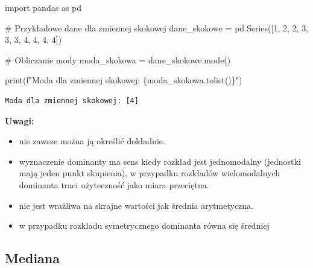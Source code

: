 \documentclass[
  polish,
  letterpaper,
  DIV=11,
  numbers=noendperiod]{scrreprt}
\newenvironment{Shaded}{\begin{snugshade}}{\end{snugshade}}
\newcommand{\BuiltInTok}[1]{\textcolor[rgb]{0.00,0.23,0.31}{#1}}
\newcommand{\CommentTok}[1]{\textcolor[rgb]{0.37,0.37,0.37}{#1}}
\newcommand{\DecValTok}[1]{\textcolor[rgb]{0.68,0.00,0.00}{#1}}
\newcommand{\ImportTok}[1]{\textcolor[rgb]{0.00,0.46,0.62}{#1}}
\newcommand{\NormalTok}[1]{\textcolor[rgb]{0.00,0.23,0.31}{#1}}
\newcommand{\OperatorTok}[1]{\textcolor[rgb]{0.37,0.37,0.37}{#1}}
\newcommand{\SpecialCharTok}[1]{\textcolor[rgb]{0.37,0.37,0.37}{#1}}
\newcommand{\SpecialStringTok}[1]{\textcolor[rgb]{0.13,0.47,0.30}{#1}}
\providecommand{\tightlist}{%
  \setlength{\itemsep}{0pt}\setlength{\parskip}{0pt}}
\begin{document}
\begin{Shaded}
\begin{Highlighting}[]
\ImportTok{import}\NormalTok{ pandas }\ImportTok{as}\NormalTok{ pd}

\CommentTok{\# Przykładowe dane dla zmiennej skokowej}
\NormalTok{dane\_skokowe }\OperatorTok{=}\NormalTok{ pd.Series([}\DecValTok{1}\NormalTok{, }\DecValTok{2}\NormalTok{, }\DecValTok{2}\NormalTok{, }\DecValTok{3}\NormalTok{, }\DecValTok{3}\NormalTok{, }\DecValTok{3}\NormalTok{, }\DecValTok{4}\NormalTok{, }\DecValTok{4}\NormalTok{, }\DecValTok{4}\NormalTok{, }\DecValTok{4}\NormalTok{])}

\CommentTok{\# Obliczanie mody}
\NormalTok{moda\_skokowa }\OperatorTok{=}\NormalTok{ dane\_skokowe.mode()}

\BuiltInTok{print}\NormalTok{(}\SpecialStringTok{f"Moda dla zmiennej skokowej: }\SpecialCharTok{\{}\NormalTok{moda\_skokowa}\SpecialCharTok{.}\NormalTok{tolist()}\SpecialCharTok{\}}\SpecialStringTok{"}\NormalTok{)}
\end{Highlighting}
\end{Shaded}

\begin{verbatim}
Moda dla zmiennej skokowej: [4]
\end{verbatim}

\textbf{Uwagi:}

\begin{itemize}
\tightlist
\item
  nie zawsze można ją określić dokładnie.
\item
  wyznaczenie dominanty ma sens kiedy rozkład jest jednomodalny
  (jednostki mają jeden punkt skupienia), w przypadku rozkładów
  wielomodalnych dominanta traci użyteczność jako miara przeciętna.
\item
  nie jest wrażliwa na skrajne wartości jak średnia arytmetyczna.
\item
  w przypadku rozkładu symetrycznego dominanta równa się średniej
\end{itemize}

\subsection{Mediana}\label{mediana}
\end{document}
